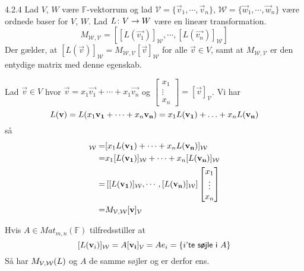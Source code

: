 %
% 

\begin{saetning}{4.2.4}
	Lad $V$, $W$ være $\mathbb{F}$-vektorrum og lad $\mathcal{V}=\{\vec{v}_1,
	\cdots,\vec{v}_n\}$, $\mathcal{W}=\{\vec{w}_1,\cdots,\vec{w}_n\}$ være
	ordnede baser for $V$, $W$. Lad $L \colon V \rightarrow W$ være en lineær transformation.
	\[
		M_{\mathcal{W},\mathcal{V}} = [[L(\vec{v_1})]_\mathcal{W}, \cdots,
		[L(\vec{v_n})]_\mathcal{W}]
	\]
	Der gælder, at $[L(\vec{v})]_\mathcal{W} = M_{\mathcal{W},\mathcal{V}}
	[\vec{v}]_\mathcal{W}$ for alle $\vec{v} \in V$, samt at
	$M_{\mathcal{W},\mathcal{V}}$ er den entydige matrix med denne egenskab.
\end{saetning}

\begin{bevis}
	Lad $\vec{v} \in V$ hvor $\vec{v} = x_1 \vec{v_1} + \cdots + x_1 \vec{v_n}$
	og $\begin{bmatrix} x_1 \\ \vdots \\ x_n \end{bmatrix} =
	[\vec{v}]_\mathcal{V}$. Vi har
	\[
		L(\mathbf{v}) = L(x_1 \mathbf{v_1} + \cdots + x_n \mathbf{v_n}) = x_1L(\mathbf{v_1}) + 
		\dotsc + x_nL(\mathbf{v_n})
	\]
	så
	\begin{align*}
		[L(\vv)]_\sW =& [x_1 L(\vec{v_1}) + \cdots + x_n L(\vec{v_n})]_\sW \\
			=& x_1 [L(\vec{v_1})]_\sW + \cdots + x_n [L(\vec{v_n})]_\sW \\
			=& \left[ [L(\vec{v_1})]_\sW, \cdots, [L(\vec{v_n})]_\sW
				\right] \begin{bmatrix}
					x_1 \\
					\vdots \\
					x_n
				\end{bmatrix} \\
			=& M_{\sV,\sW} [\vv]_\sV
	\end{align*}

	Hvis $A \in Mat_{m,n}(\mathbb{F})$ tilfredsstiller at
	\[
		[L(\mathbf{v}_i)]_{\mathcal{W}} = A[\mathbf{v_i}]_{\mathcal{V}} = Ae_i = \{i \textsf{'te søjle i } A\}
	\]
	Så har $M_{\mathcal{V},\mathcal{W}}(L)$ og $A$ de samme søjler og er derfor ens.
\end{bevis}
